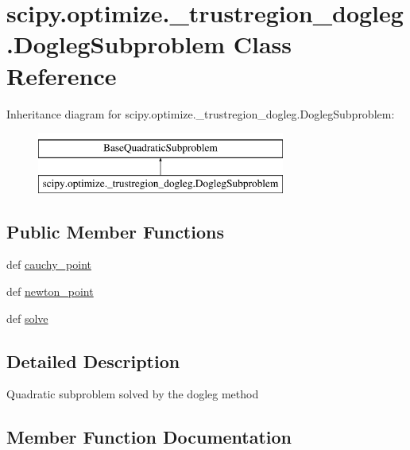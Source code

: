 \hypertarget{classscipy_1_1optimize_1_1__trustregion__dogleg_1_1DoglegSubproblem}{}\section{scipy.\+optimize.\+\_\+trustregion\+\_\+dogleg.\+Dogleg\+Subproblem Class Reference}
\label{classscipy_1_1optimize_1_1__trustregion__dogleg_1_1DoglegSubproblem}
Inheritance diagram for scipy.\+optimize.\+\_\+trustregion\+\_\+dogleg.\+Dogleg\+Subproblem\+:\begin{figure}[H]
\begin{center}
\leavevmode
\includegraphics[height=2.000000cm]{classscipy_1_1optimize_1_1__trustregion__dogleg_1_1DoglegSubproblem}
\end{center}
\end{figure}
\subsection*{Public Member Functions}
\begin{DoxyCompactItemize}
\item 
def \hyperlink{classscipy_1_1optimize_1_1__trustregion__dogleg_1_1DoglegSubproblem_a124675dd48861f84f6a932396dfa8a0d}{cauchy\+\_\+point}
\item 
def \hyperlink{classscipy_1_1optimize_1_1__trustregion__dogleg_1_1DoglegSubproblem_af9be248619c78b2b3dcb35b984bfab4f}{newton\+\_\+point}
\item 
def \hyperlink{classscipy_1_1optimize_1_1__trustregion__dogleg_1_1DoglegSubproblem_a60321f9ce4340fd18f09e1d5545575a4}{solve}
\end{DoxyCompactItemize}


\subsection{Detailed Description}
\begin{DoxyVerb}Quadratic subproblem solved by the dogleg method\end{DoxyVerb}
 

\subsection{Member Function Documentation}
\hypertarget{classscipy_1_1optimize_1_1__trustregion__dogleg_1_1DoglegSubproblem_a124675dd48861f84f6a932396dfa8a0d}{}
